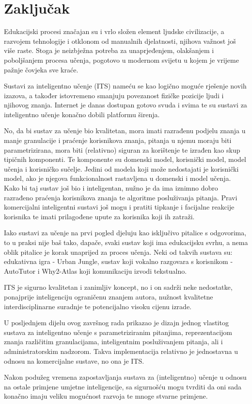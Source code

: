 \documentclass[times, utf8, zavrsni, numeric]{fer}
\begin{document}
\chapter{Zaključak}
Edukacijski procesi značajan su i vrlo složen element ljudske civilizacije, a razvojem tehnologije i otklonom od manualnih djelatnosti, njihova važnost još više raste. Stoga je neizbježna potreba za unaprjeđenjem, olakšanjem i poboljšanjem procesa učenja, pogotovo u modernom svijetu u kojem je vrijeme pažnje čovjeka sve kraće.
\par
Sustavi za inteligentno učenje (ITS) nameću se kao logično moguće rješenje novih izazova, a također istovremeno smanjuju povezanost fizičke pozicije ljudi i njihovog znanja. Internet je danas dostupan gotovo svuda i svima te su sustavi za inteligentno učenje konačno dobili platformu širenja.
\par 
No, da bi sustav za učenje bio kvalitetan, mora imati razrađenu podjelu znanja u manje granulacije i praćenje korisnikova znanja, pitanja u njemu moraju biti parametrizirana, mora biti (relativno) siguran za korištenje te izrađen kao skup tipičnih komponenti. Te komponente su domenski model, korisnički model, model učenja i korisničko sučelje. Jedini od modela koji može nedostajati je korisnički model, ako je njegova funkcionalnost rastavljena u domenski i model učenja. Kako bi taj sustav još bio i inteligentan, nužno je da ima iznimno dobro razrađeno praćenja korisnikova znanja te algoritme posluživanja pitanja. Pravi  komercijalni inteligentni sustavi još mogu i pratiti tipkanje i facijalne reakcije korisnika te imati prilagođene upute za korisnika koji ih zatraži.
\par
Iako sustavi za učenje na prvi pogled djeluju kao isključivo pitalice s odgovorima, to u praksi nije baš tako, dapače, svaki sustav koji ima edukacijsku svrhu, a nema oblik pitalice je korak unaprijed za proces učenja. Neki od takvih sustava su: edukativna igra - Urban Jungle, sustav koji vokalno razgovara s korisnikom - AutoTutor i Why2-Atlas koji komunikaciju izvodi tekstualno.
\par
ITS je sigurno kvalitetan i zanimljiv koncept, no i on sadrži neke nedostatke, ponajprije inteligenciju ograničenu znanjem autora, nužnost kvalitetne interdisciplinarne suradnje te potencijalno visoku cijenu izrade.
\par
U posljednjem dijelu ovog završnog rada prikazao je dizajn jednog vlastitog sustava za inteligentno učenje s parametriziranim pitanjima, reprezentacijom znanja različitim granulacijama, inteligentnim posluživanjem pitanja, ali i administratorskim nadzorom. Takva implementacija relativno je jednostavna u odnosu na komercijalne sustave, no ona je ITS.
\par
Nakon podužeg vremena zapostavljanja sustava za (inteligentno) učenje u odnosu na ostale primjene umjetne inteligencije, sa sigurnošću mogu tvrditi da oni sada konačno imaju veliku mogućnost razvoja te mnoge stvarne primjene.
\end{document}
